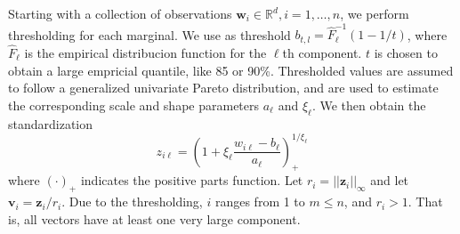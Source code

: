 Starting with a collection of observations 
    $\bm{w}_i \in {\mathbb R}^d, i = 1, \ldots, n$, we perform thresholding 
    for each marginal. We use as threshold 
    $b_{t,l} = \hat{F}^{-1}_{\ell}(1 - 1/t)$, where $\hat{F}_\ell$ is the 
    empirical distribucion function for the $\ell$th component. $t$ is 
    chosen to obtain a large empricial quantile, like 85 or 90\%. Thresholded 
    values are assumed to follow a generalized univariate Pareto distribution, 
    and are used to estimate the corresponding scale and shape parameters 
    $a_\ell$ and $\xi_\ell$. We then obtain the standardization
    \begin{equation}
        \label{eqn:standardization}
        z_{i\ell} = \left(1 + \xi_{\ell}\frac{w_{i\ell} -
            b_{\ell}}{a_{\ell}}\right)_{+}^{1/\xi_{\ell}}
    \end{equation}
    where $(\cdot)_+$ indicates the positive parts function. Let 
    $r_i = ||\bm{z}_i||_\infty$ and let $\bm{v}_i = \bm{z}_i/r_i$. Due to the 
    thresholding, $i$ ranges from 1 to $m\leq n$, and $r_i>1$.  That is, all 
    vectors have at least one very large component.

